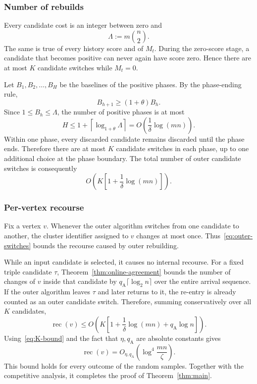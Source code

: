 \documentclass[11pt]{article}
\theoremstyle{definition}
\theoremstyle{remark}
\newcommand{\rec}{\operatorname{rec}}
\newcommand{\1}{\mathbf 1}
\begin{document}
\subsubsection{Number of rebuilds}

Every candidate cost is an integer between zero and
\begin{equation}\label{eq:Lambda-definition}
 \Lambda:=m\binom n2.
\end{equation}
The same is true of every history score and of $M_t$.  During the zero-score
stage, a candidate that becomes positive can never again have score zero.
Hence there are at most $K$ candidate switches while $M_t=0$.

Let $B_1,B_2,\ldots,B_H$ be the baselines of the positive phases.  By the
phase-ending rule,
\[
 B_{h+1}\ge(1+\theta)B_h.
\]
Since $1\le B_h\le\Lambda$, the number of positive phases is at most
\begin{equation}\label{eq:number-phases}
 H
 \le
 1+\left\lceil\log_{1+\theta}\Lambda\right\rceil
 =O\!\left(\frac{1}{\delta}\log(mn)\right).
\end{equation}
Within one phase, every discarded candidate remains discarded until the
phase ends.  Therefore there are at most $K$ candidate switches in each
phase, up to one additional choice at the phase boundary.  The total number
of outer candidate switches is consequently
\begin{equation}\label{eq:outer-switches}
 O\!\left(
 K\left[1+\frac{1}{\delta}\log(mn)\right]
 \right).
\end{equation}

\subsubsection{Per-vertex recourse}

Fix a vertex $v$.  Whenever the outer algorithm switches from one candidate
to another, the cluster identifier assigned to $v$ changes at most once.
Thus~\eqref{eq:outer-switches} bounds the recourse caused by outer rebuilding.

While an input candidate is selected, it causes no internal recourse.  For a
fixed triple candidate $\tau$, Theorem~\ref{thm:online-agreement} bounds the
number of changes of $v$ inside that candidate by
$q_{\mathrm A}\lceil\log_2 n\rceil$ over the entire arrival sequence.  If
the outer algorithm leaves $\tau$ and later returns to it, the re-entry is
already counted as an outer candidate switch.  Therefore, summing
conservatively over all $K$ candidates,
\begin{equation}\label{eq:recourse-explicit}
 \rec(v)
 \le
 O\!\left(
 K\left[
   1+\frac{1}{\delta}\log(mn)
   +q_{\mathrm A}\log n
 \right]
 \right).
\end{equation}
Using~\eqref{eq:K-bound} and the fact that $\eta,q_{\mathrm A}$ are absolute
constants gives
\begin{equation}\label{eq:recourse-polylog}
 \rec(v)
 =O_{\eta,q_{\mathrm A}}\!\left(
    \log^4\!\frac{mn}{\zeta}
  \right).
\end{equation}
This bound holds for every outcome of the random samples.  Together with the
competitive analysis, it completes the proof of
Theorem~\ref{thm:main}.
\end{document}

